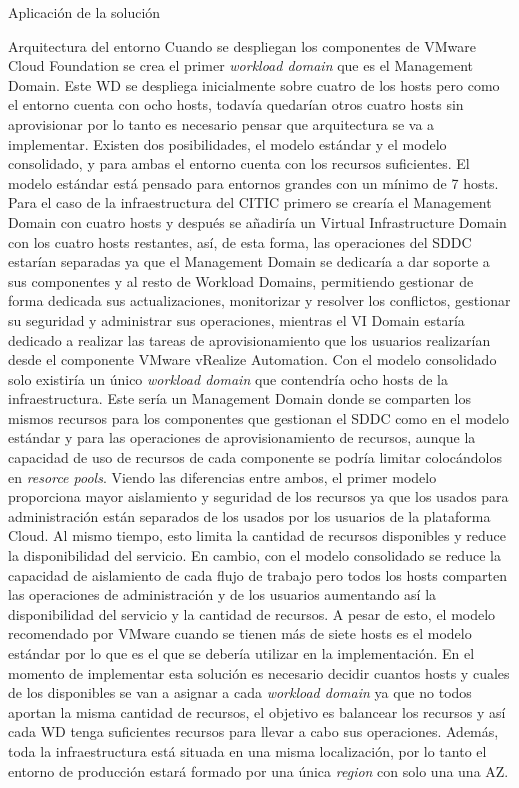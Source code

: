 \begin{chapter}{Aplicación de la solución}
\begin{section}{Arquitectura del entorno}
Cuando se despliegan los componentes de VMware Cloud Foundation se crea el primer \textit{workload domain} que es el Management Domain. Este WD se despliega inicialmente sobre cuatro de los hosts pero como el entorno cuenta con ocho hosts, todavía quedarían otros cuatro hosts sin aprovisionar por lo tanto es necesario pensar que arquitectura se va a implementar. Existen dos posibilidades, el modelo estándar y el modelo consolidado, y para ambas el entorno cuenta con los recursos suficientes.
El modelo estándar está pensado para entornos grandes con un mínimo de 7 hosts. Para el caso de la infraestructura del CITIC primero se crearía el Management Domain con cuatro hosts y después se añadiría un Virtual Infrastructure Domain con los cuatro hosts restantes, así, de esta forma, las operaciones del SDDC estarían separadas ya que el Management Domain se dedicaría a dar soporte a sus componentes y al resto de Workload Domains, permitiendo gestionar de forma dedicada sus actualizaciones, monitorizar y resolver los conflictos, gestionar su seguridad y administrar sus operaciones, mientras el VI Domain estaría dedicado a realizar las tareas de aprovisionamiento que los usuarios realizarían desde el componente VMware vRealize Automation.
Con el modelo consolidado solo existiría un único \textit{workload domain} que contendría ocho hosts de la infraestructura. Este sería un Management Domain donde se comparten los mismos recursos para los componentes que gestionan el SDDC como en el modelo estándar y para las operaciones de aprovisionamiento de recursos, aunque la capacidad de uso de recursos de cada componente se podría limitar colocándolos en \textit{resorce pools}.
Viendo las diferencias entre ambos, el primer modelo proporciona mayor aislamiento y seguridad de los recursos ya que los usados para administración están separados de los usados por los usuarios de la plataforma Cloud. Al mismo tiempo, esto limita la cantidad de recursos disponibles y reduce la disponibilidad del servicio. En cambio, con el modelo consolidado se reduce la capacidad de aislamiento de cada flujo de trabajo pero todos los hosts comparten las operaciones de administración y de los usuarios aumentando así la disponibilidad del servicio y la cantidad de recursos. A pesar de esto, el modelo recomendado por VMware cuando se tienen más de siete hosts es el modelo estándar por lo que es el que se debería utilizar en la implementación. En el momento de implementar esta solución es necesario decidir cuantos hosts y cuales de los disponibles se van a asignar a cada \textit{workload domain} ya que no todos aportan la misma cantidad de recursos, el objetivo es balancear los recursos y así cada WD tenga suficientes recursos para llevar a cabo sus operaciones.
Además, toda la infraestructura está situada en una misma localización, por lo tanto el entorno de producción estará formado por una única \textit{region} con solo una una AZ.


\end{section}
\end{chapter}
